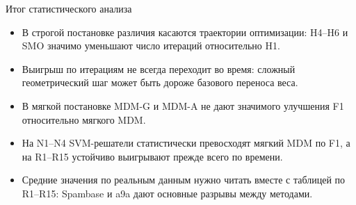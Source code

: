 \SPBGContentSlide
  {Итог статистического анализа}
  {%
    \Body
    \begin{itemize}
      \item В строгой постановке различия касаются траектории оптимизации:
      H4--H6 и SMO значимо уменьшают число итераций относительно H1.
      \item Выигрыш по итерациям не всегда переходит во время: сложный
      геометрический шаг может быть дороже базового переноса веса.
      \item В мягкой постановке MDM-G и MDM-A не дают значимого улучшения F1
      относительно мягкого MDM.
      \item На N1--N4 SVM-решатели статистически превосходят мягкий MDM по F1,
      а на R1--R15 устойчиво выигрывают прежде всего по времени.
      \item Средние значения по реальным данным нужно читать вместе с таблицей
      по R1--R15: Spambase и a9a дают основные разрывы между методами.
    \end{itemize}
  }
